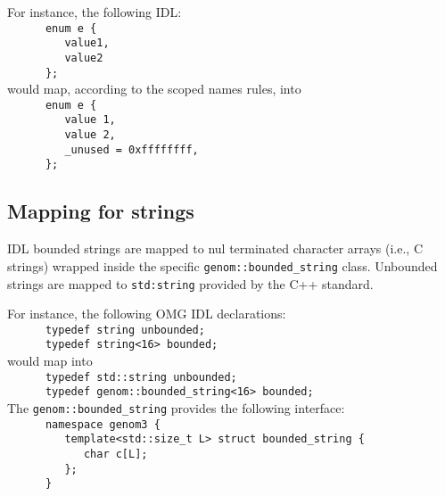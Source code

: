 For instance, the following IDL:\hfill\\
\verb|      enum e {|\hfill\\
\verb|         value1,|\hfill\\
\verb|         value2|\hfill\\
\verb|      };|\hfill\\

would map, according to the scoped names rules, into\hfill\\
\verb|      enum e {|\hfill\\
\verb|         value 1,|\hfill\\
\verb|         value 2,|\hfill\\
\verb|         _unused = 0xffffffff,|\hfill\\
\verb|      };|\hfill\\


\subsection{Mapping for strings}

\GenoM{}  IDL bounded  strings are  mapped to  nul terminated  character arrays
(i.e.,  C strings)  wrapped  inside the  specific {\tt  genom::bounded\_string}
class. Unbounded strings are mapped to {\tt std:string} provided by the C++
standard.

For instance, the following OMG IDL declarations:\hfill\\
\verb|      typedef string unbounded;|\hfill\\
\verb|      typedef string<16> bounded;|\hfill\\

would map into\hfill\\
\verb|      typedef std::string unbounded;|\hfill\\
\verb|      typedef genom::bounded_string<16> bounded;|\hfill\\

The {\tt genom::bounded\_string} provides the following interface:\hfill\\
\verb|      namespace genom3 {|\hfill\\
\verb|         template<std::size_t L> struct bounded_string {|\hfill\\
\verb|            char c[L];|\hfill\\
\verb|         };|\hfill\\
\verb|      }|\hfill\\

